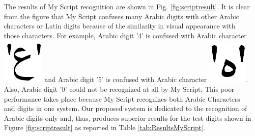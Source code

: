 \documentclass[times, 10pt,twocolumn]{article}
\begin{document}




 The results of My Script recognition are shown in Fig. \ref{fig:scriptresult}. It is clear from the figure that My Script confuses many Arabic digits with other Arabic characters or Latin digits because of the similarity in visual appearance with those characters. For example, Arabic digit '4' is confused with Arabic character \includegraphics[scale=0.2]{ean.jpg} and Arabic digit '5' is confused with Arabic character  \includegraphics[scale=0.2]{haa.jpg}. Also, Arabic digit '0' could not be recognized at all by My Script. This poor performance takes place because My Script recognizes both Arabic Characters and digits in one system. Our proposed system is dedicated to the recognition of Arabic digits only and, thus, produces superior results for the test digits shown in Figure \ref{fig:scriptresult} as reported in Table \ref{tab:ResultsMyScript}.


\end{document}
